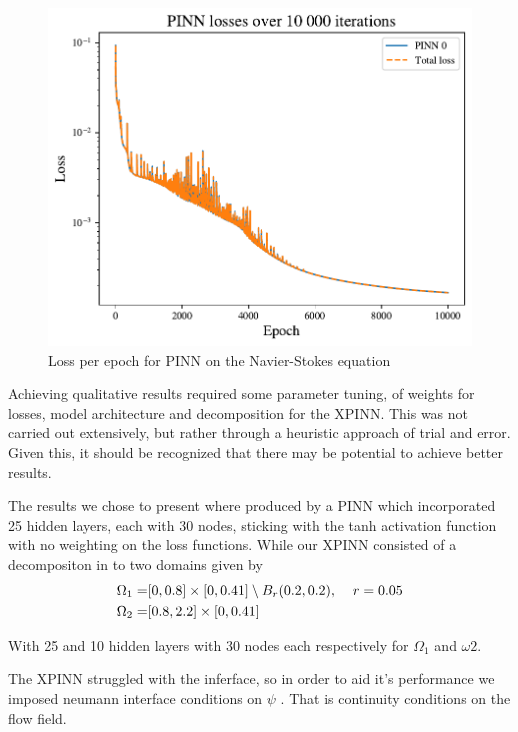 \begin{figure}[h]
    \centering
    \includegraphics[width=\linewidth]{Project1XPINNs/figures/NavierStokes/NoDecomp/ND_10000_iter_30x25/losses/PINN_losses.pdf}
    \caption{Loss per epoch for PINN on the Navier-Stokes equation}
    \label{fig:NS_PINN_loss}
\end{figure}


\par
Achieving qualitative results required some parameter tuning, of weights for losses, model architecture and decomposition for the XPINN. This was not carried out extensively, but rather through a heuristic approach of trial and error. Given this, it should be recognized that there may be potential to achieve better results. 

The results we chose to present where produced by a PINN which incorporated 25 hidden layers, each with 30 nodes, sticking with the tanh activation function with no weighting on the loss functions. While our XPINN consisted of a decompositon in to two domains given by
\begin{align*}
    \Omega_1 =& [0, 0.8] \times [0,0.41] \setminus B_r(0.2,0.2), \hspace{4mm} r = 0.05\\
    \Omega_2 =& [0.8, 2.2] \times [0, 0.41]
\end{align*}

With 25 and 10 hidden layers with 30 nodes each respectively for $\Omega_1$ and $\omega2$.
\par
The XPINN struggled with the inferface, so in order to aid it's performance we imposed neumann interface conditions on $\psi$ .  That is continuity conditions on the flow field.

